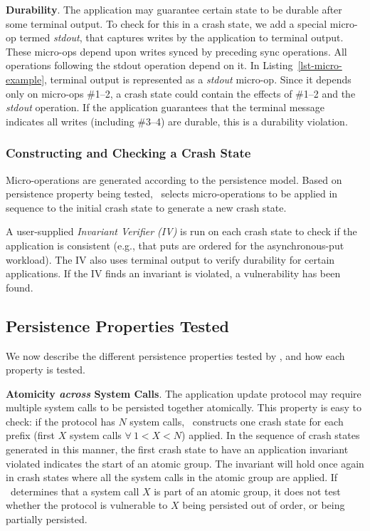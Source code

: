 \textbf{Durability}. The application may guarantee certain state to be durable
after some terminal output. To check for this in a crash state, we add a special
micro-op termed \textit{stdout}, that captures writes by the application to
terminal output. These micro-ops depend upon writes synced by preceding sync
operations. All operations following the stdout operation depend on it. In
Listing~\ref{lst-micro-example}, terminal output is represented as a
\textit{stdout} micro-op. Since it depends only on micro-ops \#1--2, a crash
state could contain the effects of \#1--2 and the \textit{stdout}
operation. If the application guarantees that the terminal message indicates all writes
(including \#3--4) are durable, this is a durability violation.

\subsubsection{Constructing and Checking a Crash State}
\label{sec-construct}

Micro-operations are generated according to the persistence model. Based on
persistence property being tested, \toolname\ selects micro-operations to be
applied in sequence to the initial crash state to generate a new crash state.

A user-supplied \textit{Invariant Verifier (IV)} is run on each crash state to
check if the application is consistent (e.g., that puts are ordered for the 
asynchronous-put workload). The IV
also uses terminal output to verify durability for certain applications. If
the IV finds an invariant is violated, a vulnerability has been found. %

\subsection{Persistence Properties Tested}
\label{sec-pptested}
We now describe the different persistence properties tested by \toolname, and how
each property is tested.

\textbf{Atomicity \textit{across} System Calls}. The application update
protocol may require multiple system calls to be persisted together atomically.
This property is easy to check: if the protocol has $N$ system
calls, \toolname\ constructs one crash state for each prefix (first $X$ system
calls $\forall\ 1 < X < N$) applied. In the sequence of crash states generated
in this manner, the first crash state to have an application invariant violated
indicates the start of an atomic group. The invariant will hold once again in
crash states where all the system calls in the atomic group are applied. If
\toolname\ determines that a system call $X$ is part of an atomic
group, it does not test whether the protocol is vulnerable to $X$ being
persisted out of order, or being partially persisted.    


